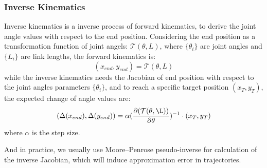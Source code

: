 \documentclass{article}
\begin{document}
\subsubsection{Inverse Kinematics}
Inverse kinematics is a inverse process of forward kinematics, to derive the joint angle values with respect to the end position. Considering the end position as a transformation function of joint angels: $\mathcal{T}(\theta, L)$, where $\{\theta_i\}$ are joint angles and $\{L_i\}$ are link lengths, the forward kinematics is:
\begin{equation}
 (x_{end}, y_{end}) = \mathcal{T}(\theta, L)
\end{equation}
while the inverse kinematics needs the Jacobian of end position with respect to the joint angles parameters $\{\theta_i\}$, and to reach a specific target position $(x_T, y_T)$, the expected change of angle values are:
\begin{equation}
	(\Delta(x_{end}), \Delta(y_{end})) = \alpha (\frac{\partial(\mathcal{T}(\theta, \L))}{\partial \theta})^{-1} \cdot (x_T, y_T)
\end{equation}
where $\alpha$ is the step size. 

And in practice, we usually use Moore–Penrose pseudo-inverse for calculation of the inverse Jacobian, which will induce approximation error in trajectories.
\end{document}
